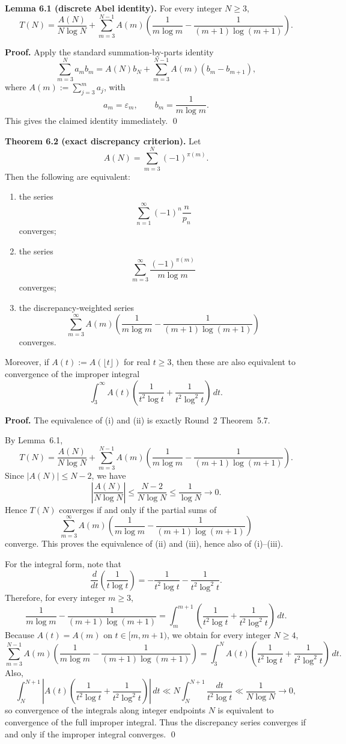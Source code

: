 \medskip

\textbf{Lemma 6.1 (discrete Abel identity).}
For every integer \(N\ge 3\),
\[
T(N)
=
\frac{A(N)}{N\log N}
+
\sum_{m=3}^{N-1}
A(m)\left(
\frac{1}{m\log m}
-
\frac{1}{(m+1)\log(m+1)}
\right).
\]

\textbf{Proof.}
Apply the standard summation-by-parts identity
\[
\sum_{m=3}^N a_m b_m
=
A(N)b_N + \sum_{m=3}^{N-1} A(m)(b_m-b_{m+1}),
\]
where \(A(m):=\sum_{j=3}^m a_j\), with
\[
a_m=\varepsilon_m,\qquad b_m=\frac{1}{m\log m}.
\]
This gives the claimed identity immediately. \qed

\medskip

\textbf{Theorem 6.2 (exact discrepancy criterion).}
Let
\[
A(N)=\sum_{m=3}^N (-1)^{\pi(m)}.
\]
Then the following are equivalent:

\begin{enumerate}
\item[(i)] the series
\[
\sum_{n=1}^\infty (-1)^n \frac{n}{p_n}
\]
converges;

\item[(ii)] the series
\[
\sum_{m=3}^\infty \frac{(-1)^{\pi(m)}}{m\log m}
\]
converges;

\item[(iii)] the discrepancy-weighted series
\[
\sum_{m=3}^\infty
A(m)\left(
\frac{1}{m\log m}
-
\frac{1}{(m+1)\log(m+1)}
\right)
\]
converges.
\end{enumerate}

Moreover, if \(A(t):=A(\lfloor t\rfloor)\) for real \(t\ge 3\), then these are also equivalent to convergence of the improper integral
\[
\int_3^\infty
A(t)\left(\frac{1}{t^2\log t}+\frac{1}{t^2\log^2 t}\right)\,dt.
\]

\textbf{Proof.}
The equivalence of (i) and (ii) is exactly Round~2 Theorem~5.7.

By Lemma~6.1,
\[
T(N)
=
\frac{A(N)}{N\log N}
+
\sum_{m=3}^{N-1}
A(m)\left(
\frac{1}{m\log m}
-
\frac{1}{(m+1)\log(m+1)}
\right).
\]
Since \(|A(N)|\le N-2\), we have
\[
\left|\frac{A(N)}{N\log N}\right|
\le \frac{N-2}{N\log N}
\le \frac{1}{\log N}
\to 0.
\]
Hence \(T(N)\) converges if and only if the partial sums of
\[
\sum_{m=3}^\infty
A(m)\left(
\frac{1}{m\log m}
-
\frac{1}{(m+1)\log(m+1)}
\right)
\]
converge. This proves the equivalence of (ii) and (iii), hence also of (i)--(iii).

For the integral form, note that
\[
\frac{d}{dt}\!\left(\frac{1}{t\log t}\right)
=
-\frac{1}{t^2\log t}-\frac{1}{t^2\log^2 t}.
\]
Therefore, for every integer \(m\ge 3\),
\[
\frac{1}{m\log m}
-
\frac{1}{(m+1)\log(m+1)}
=
\int_m^{m+1}
\left(
\frac{1}{t^2\log t}
+
\frac{1}{t^2\log^2 t}
\right)\,dt.
\]
Because \(A(t)=A(m)\) on \(t\in[m,m+1)\), we obtain for every integer \(N\ge 4\),
\[
\sum_{m=3}^{N-1}
A(m)\left(
\frac{1}{m\log m}
-
\frac{1}{(m+1)\log(m+1)}
\right)
=
\int_3^N
A(t)\left(
\frac{1}{t^2\log t}
+
\frac{1}{t^2\log^2 t}
\right)\,dt.
\]
Also,
\[
\int_N^{N+1}
\left|
A(t)\left(
\frac{1}{t^2\log t}
+
\frac{1}{t^2\log^2 t}
\right)
\right|\,dt
\ll
N\int_N^{N+1}\frac{dt}{t^2\log t}
\ll \frac{1}{N\log N}\to 0,
\]
so convergence of the integrals along integer endpoints \(N\) is equivalent to convergence of the full improper integral. Thus the discrepancy series converges if and only if the improper integral converges. \qed

